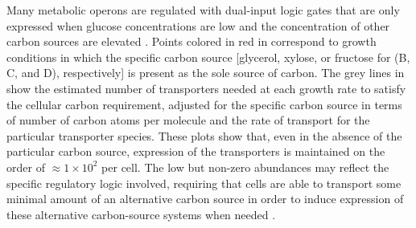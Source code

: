Many metabolic operons are regulated with dual-input logic gates that are only
expressed when glucose concentrations are low and the concentration of other
carbon sources are elevated \citep{gama-castro2016, zhang2014a, gama-castro2016,
belliveau2018, ireland2020}. Points colored in red in
 correspond to growth conditions in which the
specific carbon source [glycerol, xylose, or fructose for (B, C, and D),
respectively] is present as the sole source of carbon. The grey lines in
 show the estimated number of transporters needed at
each growth rate to satisfy the cellular carbon requirement, adjusted for the
specific carbon source in terms of number of carbon atoms per molecule and the
rate of transport for the particular transporter species. These plots show that,
even in the absence of the particular carbon source, expression of the
transporters is maintained on the order of $\approx 1 \times 10^2$ per cell. The
low but non-zero abundances may reflect the specific regulatory logic involved,
requiring that cells are able to transport some minimal amount of an alternative
carbon source in order to induce expression of these alternative carbon-source
systems when needed \citep{laxhuber2020}.


